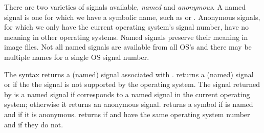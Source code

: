 There are two varieties of signals available, {\em named} and {\em anonymous}.
A named signal is one for which we have a symbolic name, such as 
 or .
Anonymous signals, for which we only have the current operating system's
 signal number, have no meaning in other operating systems.
Named signals preserve their meaning in image files.
Not all named signals are available from all OS's and
 there may be multiple names for a single OS signal number.

\begin{protos}
\end{protos}
\noindent
The syntax  returns a (named) signal associated with
.
 returns a (named) signal or  if the
 the signal  is not supported by the operating system.
The signal returned by  is a named signal if
  corresponds to a named signal in the current operating
 system; otherwise it returns an anonymous signal.
 returns a symbol if  is named and
  if it is anonymous.
 returns  if  and 
 have the same operating system number and  if they do not.

